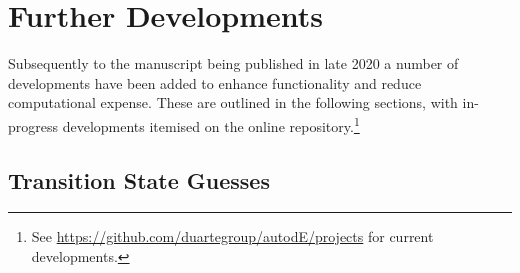\documentclass[../../main.tex]{subfiles}
\begin{document}
\setcounter{footnote}{0} 

\newcommand{\ade}{\emph{autodE }}


\section{Further Developments}

Subsequently to the manuscript being published in late 2020 a number of developments have been added to enhance functionality and reduce computational expense. These are outlined in the following sections, with in-progress developments itemised on the online repository.\footnote{See \url{https://github.com/duartegroup/autodE/projects} for current developments.}

\subsection{Transition State Guesses}
\end{document}
